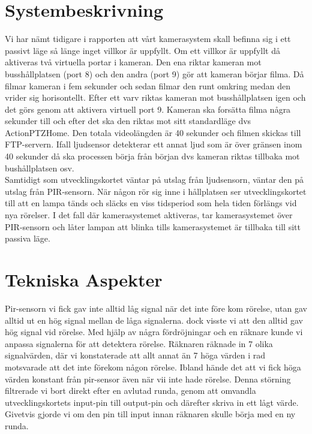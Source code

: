 \clearpage
\section{Systembeskrivning}
Vi har nämt tidigare i rapporten att vårt kamerasystem skall befinna sig i ett passivt läge så länge inget villkor är uppfyllt. Om ett villkor är uppfyllt då aktiveras två virtuella portar i kameran. Den ena riktar kameran mot busshållplatsen (port 8) och den andra (port 9) gör att kameran börjar filma. Då filmar kameran i fem sekunder och sedan filmar den runt omkring medan den vrider sig horisontellt. Efter ett varv riktas kameran mot busshållplatsen igen och det görs genom att aktivera virtuell port 9. Kameran ska forsätta filma några sekunder till och efter det ska den riktas mot sitt standardläge dvs ActionPTZHome. Den totala videolängden är 40 sekunder och filmen skickas till FTP-servern. Ifall ljudsensor detekterar ett annat ljud som är över gränsen inom 40 sekunder då ska processen börja från början dvs kameran riktas tillbaka mot bushållplatsen osv.\\
 Samtidigt som utvecklingskortet väntar på utslag från ljudsensorn, väntar den på utslag från PIR-sensorn. När någon rör sig inne i hållplatsen ser utvecklingskortet till att en lampa tänds och släcks en viss tidsperiod som hela tiden förlängs vid nya rörelser. I det fall där kamerasystemet aktiveras, tar kamerasystemet över PIR-sensorn och låter lampan att blinka tills kamerasystemet är tillbaka till sitt passiva läge.


\section{Tekniska Aspekter} 
Pir-sensorn vi fick gav inte alltid låg signal när det inte före kom rörelse, utan gav alltid ut en hög signal mellan de låga signalerna. dock visste vi att den alltid gav hög signal vid rörelse. Med hjälp av några fördröjningar och en räknare kunde vi anpassa signalerna för att detektera rörelse. Räknaren räknade in 7 olika signalvärden, där vi konstaterade att allt annat än 7 höga värden i rad motsvarade att det inte förekom någon rörelse. Ibland hände det att vi fick höga värden konstant från pir-sensor även när vii inte hade rörelse. Denna störning filtrerade vi bort direkt efter en avlutad runda, genom att omvandla utvecklingskortets input-pin till output-pin och därefter skriva in ett lågt värde. Givetvis gjorde vi om den pin till input innan räknaren skulle börja med en ny runda.

